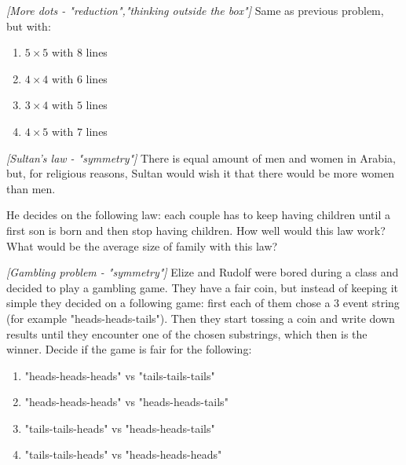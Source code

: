 \begin{problem}
\textit{[More dots - "reduction","thinking outside the box"]}
Same as previous problem, but with:
\begin{enumerate}
\item $5 \times 5$ with $8$ lines 
\item $4 \times 4$ with $6$ lines
\item $3 \times 4$ with $5$ lines
\item $4 \times 5$ with $7$ lines
\end{enumerate}
\end{problem}
%

\begin{problem}
\textit{[Sultan's law - "symmetry"]}
There is equal amount of men and women in Arabia, but, for religious reasons, Sultan would wish it that there would be more women than men. 

He decides on the following law: each couple has to keep having children until a first son is born and then stop having children. How well would this law work? What would be the average size of family with this law?
\end{problem}
%


\begin{problem}
\textit{[Gambling problem - "symmetry"]}
Elize and Rudolf were bored during a class and decided to play a gambling game. They have a fair coin, but instead of keeping it simple they decided on a following game: first each of them chose a $3$ event string (for example "heads-heads-tails"). Then they start tossing a coin and write down results until they encounter one of the chosen substrings, which then is the winner. Decide if the game is fair for the following:
\begin{enumerate}
\item "heads-heads-heads" vs "tails-tails-tails"
\item "heads-heads-heads" vs "heads-heads-tails"
\item "tails-tails-heads" vs "heads-heads-tails"
\item "tails-tails-heads" vs "heads-heads-heads"
\end{enumerate}

\end{problem}
%

